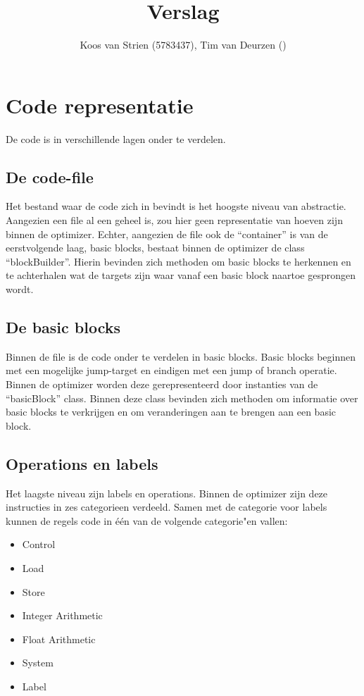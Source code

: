 \documentclass[a4paper,10pt]{article}
\author{Koos van Strien (5783437), Tim van Deurzen ()}
\title{Verslag}
\begin{document}
\maketitle

\section{Code representatie}
De code is in verschillende lagen onder te verdelen.

\subsection{De code-file}
Het bestand waar de code zich in bevindt is het hoogste niveau van 
abstractie. Aangezien een file al een geheel is, zou hier geen representatie
van hoeven zijn binnen de optimizer. Echter, aangezien de file ook de 
``container'' is van de eerstvolgende laag, basic blocks, bestaat binnen de
optimizer de class ``blockBuilder''. Hierin bevinden zich methoden om basic
blocks te herkennen en te achterhalen wat de targets zijn waar vanaf een 
basic block naartoe gesprongen wordt.

\subsection{De basic blocks}
Binnen de file is de code onder te verdelen in basic blocks. Basic blocks
beginnen met een mogelijke jump-target en eindigen met een jump of branch
operatie. Binnen de optimizer worden deze gerepresenteerd door instanties 
van de ``basicBlock'' class. Binnen deze class bevinden zich methoden om
informatie over basic blocks te verkrijgen en om veranderingen aan te brengen
aan een basic block.

\subsection{Operations en labels}
Het laagste niveau zijn labels en operations. Binnen de optimizer zijn deze 
instructies in zes categorieen verdeeld. Samen met de categorie voor labels
kunnen de regels code in \'e\'en van de volgende categorie"en vallen:
\begin{itemize}
\item Control
\item Load
\item Store
\item Integer Arithmetic
\item Float Arithmetic
\item System
\item Label
\end{itemize}
\end{document}
